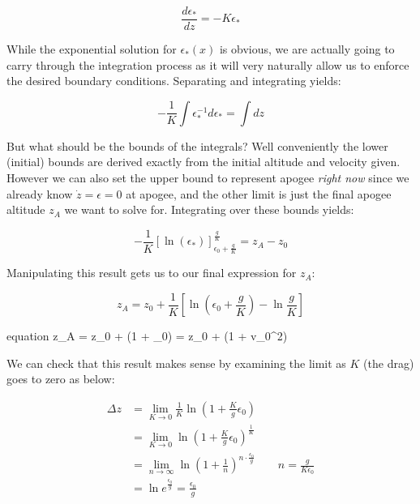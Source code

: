 \documentclass{article}
\begin{document}
	\begin{equation}
	\frac{d\epsilon_*}{dz} = -K\epsilon_*
	\end{equation}
	
	While the exponential solution for $\epsilon_*(x)$ is obvious, we are actually going to carry through the integration process as it will very naturally allow us to enforce the desired boundary conditions.  Separating and integrating yields:
	
	\begin{equation}
	-\frac{1}{K}\int\epsilon_*^{-1}d\epsilon_* = \int dz
	\end{equation}
	
	But what should be the bounds of the integrals?  Well conveniently the lower (initial) bounds are derived exactly from the initial altitude and velocity given.  However we can also set the upper bound to represent apogee \textit{right now} since we already know $\dot{z}=\epsilon=0$ at apogee, and the other limit is just the final apogee altitude $z_A$ we want to solve for.  Integrating over these bounds yields:
	 
	\begin{equation}
	-\frac{1}{K}\left[\ln\left(\epsilon_*\right)\right]_{\epsilon_0+\frac{g}{K}}^{\frac{g}{K}} = z_A - z_0
	\end{equation}
	
	Manipulating this result gets us to our final expression for $z_A$:
	
	\begin{equation}
	z_A = z_0 + \frac{1}{K}\left[\ln\left(\epsilon_0+\frac{g}{K}\right)-\ln\frac{g}{K}\right]
	\end{equation}
	
	\begin{empheq}[box=\fbox]{equation}
	\label{eqn:kapogee} z_A = z_0 + \ln\left(1 + \epsilon_0\right) = z_0 + \ln\left(1 + v_0^2\right)
	\end{empheq}
	
	We can check that this result makes sense by examining the limit as $K$ (the drag) goes to zero as below:
	
	\begin{align}
		\Delta z &= \lim\limits_{K\rightarrow0} \frac{1}{K}\ln\left(1 + \frac{K}{g}\epsilon_0\right) \\
		&=\lim\limits_{K\rightarrow0}\ln\left(1 + \frac{K}{g}\epsilon_0\right)^\frac{1}{K} \\
		&=\lim\limits_{n\rightarrow\infty}\ln\left(1+\frac{1}{n}\right)^{n\cdot \frac{\epsilon_0}{g}}\qquad n=\frac{g}{K\epsilon_0} \\
		&=\ln e^{\frac{\epsilon_0}{g}} = \frac{\epsilon_0}{g}
	\end{align}
	
\end{document}
